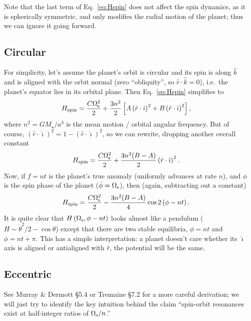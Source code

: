 \documentclass[11pt,
        usenames, %
        dvipsnames %
    ]{article}
\newcommand*{\p}[1]{\left(#1\right)}
\newcommand*{\s}[1]{\left[#1\right]}
\begin{document}
Note that the last term of Eq.~\eqref{eq:Hspin} does not affect the spin
dynamics, as it is spherically symmetric, and only modifies the radial motion of
the planet; thus we can ignore it going forward.

\subsection{Circular}

For simplicity, let's assume the planet's orbit is circular and its spin is
along $\hat{k}$ and is aligned with the orbit normal (zero ``obliquity'', so
$\hat{r} \cdot \hat{k} = 0$), i.e.\ the planet's equator lies in its orbital
plane. Then Eq.~\eqref{eq:Hspin} simplifies to
\begin{equation}
    H_{\rm spin} =
        \frac{C\Omega_{\rm s}^2}{2} + \frac{3n^2}{2}
            \s{A\p{\hat{r} \cdot \hat{\imath}}^2 + B\p{\hat{r} \cdot
            \hat{\imath}}^2},
            \label{eq:Hspin_coplanar}
\end{equation}
where $n^2 = GM_\star/a^3$ is the mean motion / orbital angular frequency. But
of course, $\p{\hat{r} \cdot \hat{\imath}}^2 = 1 - \p{\hat{r} \cdot
\hat{\imath}}^2$, so we can rewrite, dropping another overall constant
\begin{equation}
    H_{\rm spin}
        = \frac{C\Omega_{\rm s}^2}{2} + \frac{3n^2(B - A)}{2}
            \p{\hat{r} \cdot \hat{\imath}}^2.
\end{equation}
Now, if $f = nt$ is the planet's true anomaly (uniformly advances at rate $n$),
and $\phi$ is the spin phase of the planet ($\dot{\phi} = \Omega_{\rm s}$), then
(again, subtracting out a constant)
\begin{equation}
    H_{\rm spin}
        = \frac{C\Omega_{\rm s}^2}{2} - \frac{3n^2(B - A)}{4}\cos2\p{\phi - nt}.
\end{equation}
It is quite clear that $H\p{\Omega_{\rm s}, \phi - nt}$ looks almost like a pendulum ($H
\sim \dot{\theta}^2/2 - \cos\theta$) except that there are two stable
equilibria, $\phi = nt$ and $\phi = nt + \pi$. This has a simple interpretation:
a planet doesn't care whether its $\hat{\imath}$ axis is aligned or antialigned
with $\hat{r}$, the potential will be the same.

\subsection{Eccentric}

See Murray \& Dermott \S5.4 or Tremaine \S7.2 for a more careful derivation; we
will just try to identify the key intuition behind the claim ``spin-orbit
resonances exist at half-integer ratios of $\Omega_{\rm s} / n$.''
\end{document}
